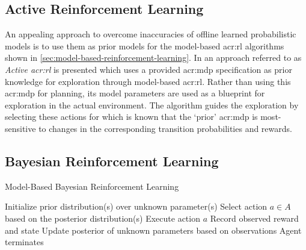 \subsection{Active Reinforcement Learning}
\label{sec:active-reinforcement-learning}

An appealing approach to overcome inaccuracies of offline learned probabilistic models is to use them as prior models for the model-based \acrshort{acr:rl} algorithms shown in \autoref{sec:model-based-reinforcement-learning}.
In \cite{epshteyn2008active} an approach referred to as \textit{Active \acrlong{acr:rl}} is presented which uses a provided \acrshort{acr:mdp} specification as prior knowledge for exploration through model-based \acrshort{acr:rl}.
Rather than using this \acrshort{acr:mdp} for planning, its model parameters are used as a blueprint for exploration in the actual environment.
The algorithm guides the exploration by selecting these actions for which is known that the `prior' \acrshort{acr:mdp} is most-sensitive to changes in the corresponding transition probabilities and rewards.



\subsection{Bayesian Reinforcement Learning}
\label{sec:bayesian-reinforcement-learning}

\begin{algorithm}[t]
	\caption{Model-Based Bayesian Reinforcement Learning}
	\label{alg:bayesian-reinforcement-learning}
	\begin{algorithmic}[1]
		\State Initialize prior distribution(s) over unknown parameter(s)
		\Repeat
		\State Select action $a \in A$ based on the posterior distribution(s)
		\State Execute action $a$
		\State Record observed reward and state
		\State Update posterior of unknown parameters based on observations
		\Until Agent terminates
	\end{algorithmic}
\end{algorithm}

